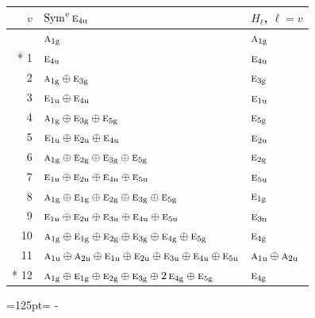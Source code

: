 \documentclass[10pt,a4paper]{article}
\newcommand{\needspace}[1]{\par\penalty-100\begingroup\dimen0=#1\relax\dimen2=\pagegoal
  \advance\dimen2-\pagetotal\ifdim\dimen0>\dimen2\relax\ifdim\dimen2>0pt\vfil\break\fi\fi
  \endgroup}
\numberwithin{equation}{section}
\newcommand{\irr}[1]{\text{\normalfont\scshape #1}}
\newcommand{\ptag}[1]{\mathrm{#1}}
\begin{document}
{\small\begin{longtable}{@{}rll@{}}\toprule
$v$ & $\operatorname{Sym}^{v}\irr{e}_{4\ptag{u}}$ & $H_\ell$, $\ell = v$\\\midrule\endhead
\bottomrule\endfoot\endlastfoot
0 & $\irr{a}_{1\ptag{g}}$ & $\irr{a}_{1\ptag{g}}$\\*
1 & $\irr{e}_{4\ptag{u}}$ & $\irr{e}_{4\ptag{u}}$\\
2 & $\irr{a}_{1\ptag{g}} \oplus \irr{e}_{3\ptag{g}}$ & $\irr{e}_{3\ptag{g}}$\\
3 & $\irr{e}_{1\ptag{u}} \oplus \irr{e}_{4\ptag{u}}$ & $\irr{e}_{1\ptag{u}}$\\
4 & $\irr{a}_{1\ptag{g}} \oplus \irr{e}_{3\ptag{g}} \oplus \irr{e}_{5\ptag{g}}$ & $\irr{e}_{5\ptag{g}}$\\
5 & $\irr{e}_{1\ptag{u}} \oplus \irr{e}_{2\ptag{u}} \oplus \irr{e}_{4\ptag{u}}$ & $\irr{e}_{2\ptag{u}}$\\
6 & $\irr{a}_{1\ptag{g}} \oplus \irr{e}_{2\ptag{g}} \oplus \irr{e}_{3\ptag{g}} \oplus \irr{e}_{5\ptag{g}}$ & $\irr{e}_{2\ptag{g}}$\\
7 & $\irr{e}_{1\ptag{u}} \oplus \irr{e}_{2\ptag{u}} \oplus \irr{e}_{4\ptag{u}} \oplus \irr{e}_{5\ptag{u}}$ & $\irr{e}_{5\ptag{u}}$\\
8 & $\irr{a}_{1\ptag{g}} \oplus \irr{e}_{1\ptag{g}} \oplus \irr{e}_{2\ptag{g}} \oplus \irr{e}_{3\ptag{g}} \oplus \irr{e}_{5\ptag{g}}$ & $\irr{e}_{1\ptag{g}}$\\
9 & $\irr{e}_{1\ptag{u}} \oplus \irr{e}_{2\ptag{u}} \oplus \irr{e}_{3\ptag{u}} \oplus \irr{e}_{4\ptag{u}} \oplus \irr{e}_{5\ptag{u}}$ & $\irr{e}_{3\ptag{u}}$\\
10 & $\irr{a}_{1\ptag{g}} \oplus \irr{e}_{1\ptag{g}} \oplus \irr{e}_{2\ptag{g}} \oplus \irr{e}_{3\ptag{g}} \oplus \irr{e}_{4\ptag{g}} \oplus \irr{e}_{5\ptag{g}}$ & $\irr{e}_{4\ptag{g}}$\\
11 & $\irr{a}_{1\ptag{u}} \oplus \irr{a}_{2\ptag{u}} \oplus \irr{e}_{1\ptag{u}} \oplus \irr{e}_{2\ptag{u}} \oplus \irr{e}_{3\ptag{u}} \oplus \irr{e}_{4\ptag{u}} \oplus \irr{e}_{5\ptag{u}}$ & $\irr{a}_{1\ptag{u}} \oplus \irr{a}_{2\ptag{u}}$\\*
12 & $\irr{a}_{1\ptag{g}} \oplus \irr{e}_{1\ptag{g}} \oplus \irr{e}_{2\ptag{g}} \oplus \irr{e}_{3\ptag{g}} \oplus 2\,\irr{e}_{4\ptag{g}} \oplus \irr{e}_{5\ptag{g}}$ & $\irr{e}_{4\ptag{g}}$\\
\bottomrule\end{longtable}}
\needspace{125pt}
\end{document}
